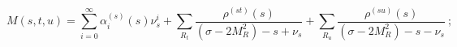 \begin{equation}
M(s,t,u) =
 \sum\limits_{i=0}^{\infty}{\alpha}^{(s)}_i(s) {\nu}_s^i +
 \sum\limits_{R_t}^{}
      \frac{\rho^{(st)}(s)}{(\sigma - 2M^2_R)-s+{\nu}_s} +
 \sum\limits_{R_u}^{}
      \frac{\rho^{(su)}(s)}{(\sigma - 2M^2_R)-s-{\nu}_s}\ ;
\label{1.10}
\end{equation}

